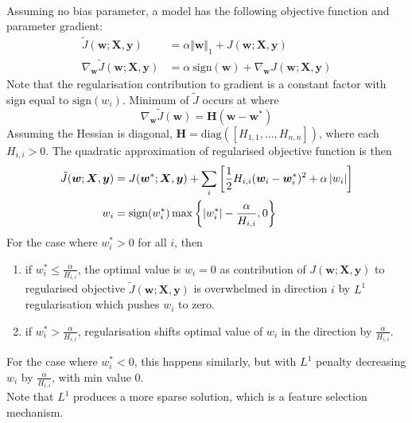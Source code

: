 \begin{definition} \\
Assuming no bias parameter, a model has the following objective function and parameter gradient:
\begin{align}
\tilde{J}(\bm{w}; \bm{X}, \bm{y}) &= \alpha \Vert \bm{w} \Vert_1 + J(\bm{w}; \bm{X}, \bm{y}) \nonumber \\
\nabla_{\bm{w}} \tilde{J}(\bm{w}; \bm{X}, \bm{y}) &= \alpha \ \text{sign}(\bm{w}) + \nabla_{\bm{w}} J(\bm{w}; \bm{X}, \bm{y}) \nonumber
\end{align}
Note that the regularisation contribution to gradient is a constant factor with sign equal to $\text{sign}(w_i)$. Minimum of $\tilde{J}$ occurs at where
\begin{equation}
\nabla_{\bm{w}} \tilde{J}(\bm{w}) = \bm{H} (\bm{w} - \bm{w}^*) \nonumber
\end{equation}
Assuming the Hessian is diagonal, $\bm{H} = \text{diag}([H_{1,1}, \ldots, H_{n,n}])$, where each $H_{i,i} > 0$. The quadratic approximation of regularised objective function is then
\begin{align}
\tilde{J}(\bm{w}; \bm{X}, \bm{y}) &= J(\bm{w}^*; \bm{X}, \bm{y}) + \sum_i \left[ \frac{1}{2} H_{i,i} (\bm{w}_i - \bm{w}_i^*)^2 + \alpha \left\lvert w_i\right\rvert \right] \nonumber \\
w_i &= \text{sign}(w_i^*) \max \left\{ \left\lvert w_i^*\right\rvert - \frac{\alpha}{H_{i,i}}, 0 \right\} \nonumber
\end{align}
For the case where $w_i^* > 0$ for all $i$, then
\begin{enumerate}[label=\roman*.]
\setlength{\itemsep}{0pt}
\item if $w_i^* \leq \frac{\alpha}{H_{i,i}}$, the optimal value is $w_i = 0$ as contribution of $J(\bm{w}; \bm{X}, \bm{y})$ to regularised objective $\tilde{J}(\bm{w}; \bm{X}, \bm{y})$ is overwhelmed in direction $i$ by $L^1$ regularisation which pushes $w_i$ to zero.
\item if $w_i^* > \frac{\alpha}{H_{i,i}}$, regularisation shifts optimal value of $w_i$ in the direction by $\frac{\alpha}{H_{i,i}}$.
\end{enumerate}
For the case where $w_i^* < 0$, this happens similarly, but with $L^1$ penalty decreasing $w_i$ by $\frac{\alpha}{H_{i,i}}$, with min value $0$.\\
Note that $L^1$ produces a more sparse solution, which is a feature selection mechanism.
\end{definition}

